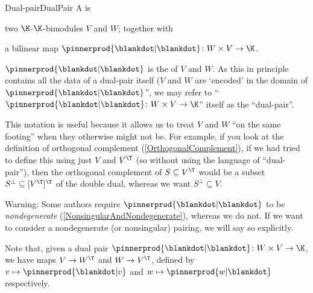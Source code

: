\begin{dfn}{Dual-pair}{DualPair}	
	A  is
	\begin{data}
		\item two $\K$-$\K$-bimodules $V$ and $W$; together with
		\item a bilinear map $\pinnerprod{\blankdot |\blankdot} \colon W\times V\rightarrow \K$\index[notation]{$\pinnerprod{\blankdot |\blankdot}$}.
	\end{data}
	\begin{rmk}
		$\pinnerprod{\blankdot |\blankdot}$ is the  of $V$ and $W$.  As this in principle contains all the data of a dual-pair itself ($V$ and $W$ are `encoded' in the domain of $\pinnerprod{\blankdot |\blankdot}$'', we may refer to ``$\pinnerprod{\blankdot |\blankdot}\colon W\times V\rightarrow \K$'' itself as the ``dual-pair''.
	\end{rmk}
	\begin{rmk}
		This notation is useful because it allows us to treat $V$ and $W$ ``on the same footing'' when they otherwise might not be.  For example, if you look at the definition of orthogonal complement (\cref{OrthogonalComplement}), if we had tried to define this using just $V$ and $V^{\T}$ (so without using the language of ``dual-pair''), then the orthogonal complement of $S\subseteq V^{\T}$ would be a subset $S^{\perp}\subseteq [V^{\T}]^{\T}$ of the double dual, whereas we want $S^{\perp}\subseteq V$.
	\end{rmk}
	\begin{rmk}
		Warning:  Some authors require $\pinnerprod{\blankdot |\blankdot}$ to be \emph{nondegenerate} (\cref{NonsingularAndNondegenerate}), whereas we do not.  If we want to consider a nondegenerate (or nonsingular) pairing, we will say so explicitly.
	\end{rmk}
\end{dfn}
Note that, given a dual pair $\pinnerprod{\blankdot |\blankdot}\colon W\times V\rightarrow \K$, we have maps $V\rightarrow W^{\T}$ and $W\rightarrow V^{\T}$, defined by $v\mapsto \pinnerprod{\blankdot |v}$ and $w\mapsto \pinnerprod{w|\blankdot}$ respectively.
